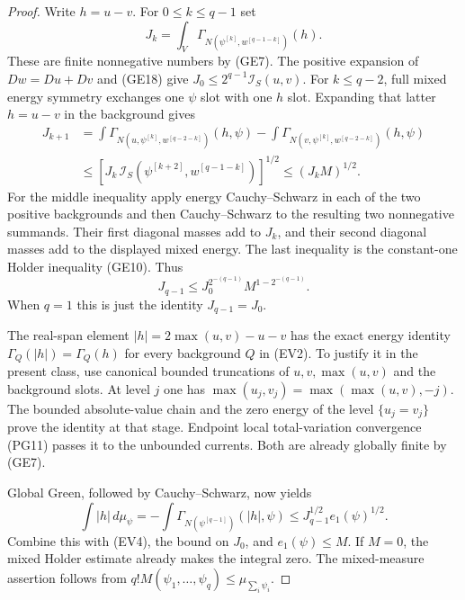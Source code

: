 \documentclass[11pt,a4paper]{article}
\numberwithin{equation}{section}
\theoremstyle{definition}
\theoremstyle{remark}
\begin{document}
\begin{proof}
Write $h=u-v$. For $0\leq k\leq q-1$ set
\[
 J_k=\int_V\Gamma_{N(\psi^{[k]},w^{[q-1-k]})}(h).
 \tag{EV2}
\]
These are finite nonnegative numbers by (GE7). The positive
expansion of $Dw=Du+Dv$ and (GE18) give
$J_0\leq2^{q-1}\mathscr I_S(u,v)$.
For $k\leq q-2$, full mixed energy symmetry exchanges one
$\psi$ slot with one $h$ slot. Expanding that latter
$h=u-v$ in the background gives
\[
 \begin{split}
 J_{k+1}
 &=\int\Gamma_{N(u,\psi^{[k]},w^{[q-2-k]})}(h,\psi)
   -\int\Gamma_{N(v,\psi^{[k]},w^{[q-2-k]})}(h,\psi)\\
 &\leq\left[J_k\,
       \mathcal I_S(\psi^{[k+2]},w^{[q-1-k]})\right]^{1/2}
 \leq(J_kM)^{1/2}.
 \end{split}
 \tag{EV3}
\]
For the middle inequality apply energy Cauchy--Schwarz in
each of the two positive backgrounds and then Cauchy--Schwarz
to the resulting two nonnegative summands. Their first
diagonal masses add to $J_k$, and their second diagonal
masses add to the displayed mixed energy. The last inequality
is the constant-one Holder inequality (GE10). Thus
\[
 J_{q-1}\leq J_0^{2^{-(q-1)}}M^{1-2^{-(q-1)}}.
 \tag{EV4}
\]
When $q=1$ this is just the identity $J_{q-1}=J_0$.

The real-span element
$|h|=2\max(u,v)-u-v$ has the exact energy identity
$\Gamma_Q(|h|)=\Gamma_Q(h)$ for every background $Q$
in (EV2). To justify it in the present class, use canonical
bounded truncations of $u,v,\max(u,v)$ and the background
slots. At level $j$ one has
$\max(u_j,v_j)=\max(\max(u,v),-j)$.
The bounded absolute-value chain and the zero energy of
the level $\{u_j=v_j\}$ prove the identity at that stage.
Endpoint local total-variation convergence (PG11) passes
it to the unbounded currents. Both are already globally
finite by (GE7).

Global Green, followed by Cauchy--Schwarz, now yields
\[
 \int|h|\,d\mu_\psi
  =-\int\Gamma_{N(\psi^{[q-1]})}(|h|,\psi)
       \leq J_{q-1}^{1/2}e_1(\psi)^{1/2}.
 \tag{EV5}
\]
Combine this with (EV4), the bound on $J_0$, and
$e_1(\psi)\leq M$. If $M=0$, the mixed Holder estimate
already makes the integral zero. The mixed-measure
assertion follows from
$q!M(\psi_1,\ldots,\psi_q)\leq\mu_{\sum_i\psi_i}$.
\end{proof}
\end{document}
